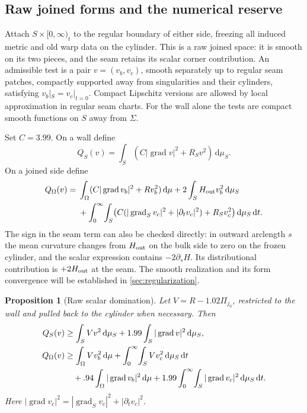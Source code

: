 \documentclass[11pt]{article}
\numberwithin{equation}{section}
\newtheorem{proposition}[theorem]{Proposition}
\theoremstyle{definition}
\theoremstyle{remark}
\begin{document}
\subsection{Raw joined forms and the numerical reserve}

Attach $S\times[0,\infty)_t$ to the regular boundary of either side,
freezing all induced metric and old warp data on the cylinder.  This
is a raw joined space: it is smooth on its two pieces, and the seam
retains its scalar corner contribution.  An admissible test is a pair
$v=(v_b,v_c)$, smooth separately up to regular seam patches, compactly
supported away from singularities and their cylinders, satisfying
$v_b|_S=v_c|_{t=0}$.  Compact Lipschitz versions are allowed by local
approximation in regular seam charts.  For the wall alone the tests are
compact smooth functions on $S$ away from $\Sigma$.

Set $C=3.99$.  On a wall define
\[
 Q_S(v)=\int_S(C|\operatorname{grad} v|^2+R_Sv^2)\,\mathrm d\mu_S.
\]
On a joined side define
\begin{align}\label{cut:raw-form}
 Q_\Omega(v)
  ={}&\int_\Omega(C|\operatorname{grad} v_b|^2+Rv_b^2)\,\mathrm d\mu
       +2\int_S H_{\rm out}v_b^2\,\mathrm d\mu_S\notag\\
    &+\int_0^\infty\!\int_S
        \bigl(C(|\operatorname{grad}_Sv_c|^2+|\partial_tv_c|^2)
                         +R_Sv_c^2\bigr)\,\mathrm d\mu_S\,\mathrm d t.
\end{align}
The sign in the seam term can also be checked directly: in outward
arclength $s$ the mean curvature changes from $H_{\rm out}$ on the
bulk side to zero on the frozen cylinder, and the scalar expression
contains $-2\partial_sH$.  Its distributional contribution is
$+2H_{\rm out}$ at the seam.  The smooth realization and its form
convergence will be established in \cref{sec:regularization}.

\begin{proposition}[Raw scalar domination]\label{cut:raw-domination}
Let $V=R-1.02\Pi_{j_0}$, restricted to the wall and pulled back to the
cylinder when necessary.  Then
\begin{align}\label{cut:wall-domination}
 Q_S(v)&\ge\int_S Vv^2\,\mathrm d\mu_S
                    +1.99\int_S|\operatorname{grad} v|^2\,\mathrm d\mu_S,\\
 Q_\Omega(v)&\ge\int_\Omega Vv_b^2\,\mathrm d\mu
       +\int_0^\infty\!\int_S Vv_c^2\,\mathrm d\mu_S\,\mathrm d t\notag\\
 &\quad+.94\int_\Omega|\operatorname{grad} v_b|^2\,\mathrm d\mu
       +1.99\int_0^\infty\!\int_S|\operatorname{grad} v_c|^2
                                      \,\mathrm d\mu_S\,\mathrm d t.
                                      \label{cut:side-domination}
\end{align}
Here $|\operatorname{grad} v_c|^2=|\operatorname{grad}_Sv_c|^2+|\partial_tv_c|^2$.
\end{proposition}
\end{document}
